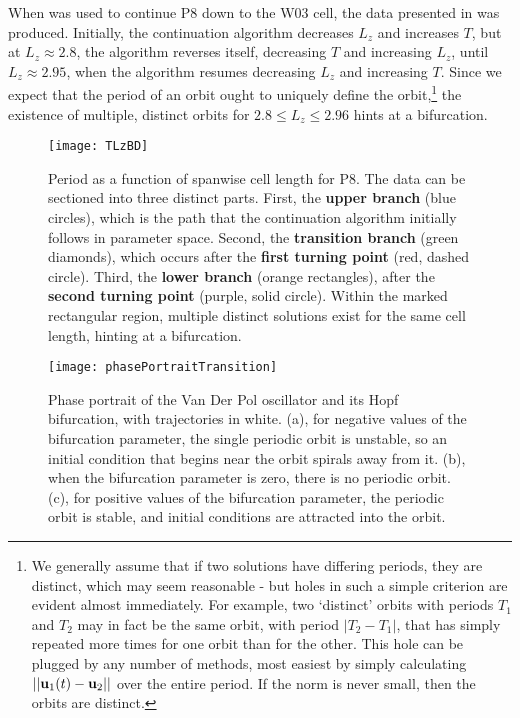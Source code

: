 When  was used to continue P8 down to the W03 cell, the data presented in  was produced.  Initially, the continuation algorithm decreases $L_z$ and increases $T$, but at $L_z \approx 2.8$, the algorithm reverses itself, decreasing $T$ and increasing $L_z$, until $L_z \approx 2.95$, when the algorithm resumes decreasing $L_z$ and increasing $T$. Since we expect that the period of an orbit ought to uniquely define the orbit,\footnote{We generally assume that if two solutions have differing periods, they are distinct, which may seem reasonable - but holes in such a simple criterion are evident almost immediately. For example, two `distinct' orbits with periods $T_1$ and $T_2$ may in fact be the same orbit, with period $|T_2-T_1|$, that has simply repeated more times for one orbit than for the other. This hole can be plugged by any number of methods, most easiest by simply calculating $||\mathbf{u}_1(t) - \mathbf{u}_2||$ over the entire period. If the norm is never small, then the orbits are distinct. }  the existence of multiple, distinct orbits for $2.8 \leq L_z \leq 2.96$ hints at a bifurcation. 
\begin{figure}[t]
\texttt{[image: TLzBD]}
\caption{Period as a function of spanwise cell length for P8. The data can be sectioned into three distinct parts. First, the {\bf upper branch} (blue circles), which is the path that the continuation algorithm initially follows in parameter space. Second, the {\bf transition branch} (green diamonds), which occurs after the {\bf first turning point} (red, dashed circle). Third, the {\bf lower branch} (orange rectangles), after the {\bf second turning point} (purple, solid circle). Within the marked rectangular region, multiple distinct solutions exist for the same cell length, hinting at a bifurcation.}\label{fig:LZBif}
\end{figure}
\begin{figure}[t]
\texttt{[image: phasePortraitTransition]}
\caption{Phase portrait of the Van Der Pol oscillator and its Hopf bifurcation, with trajectories in white. (a), for negative values of the bifurcation parameter, the single periodic orbit is unstable, so an initial condition that begins near the orbit spirals away from it. (b), when the bifurcation parameter is zero, there is no periodic orbit. (c), for positive values of the bifurcation parameter, the periodic orbit is stable, and initial conditions are attracted into the orbit.}\label{fig:phasePortrait}
\end{figure}
